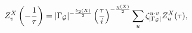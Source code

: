 \begin{equation}
Z^X_v\left(-\frac{1}{\tau}\right)=\vert\Gamma_{\cal G}\vert^{-\frac{b_2(X)}{2}}
\left(
\frac{\tau}{i}
\right)^{-\frac{\chi(X)}{2}}
\sum_u\zeta_{|\Gamma_{\cal G}|}^{u\cdot v}Z_u^X(\tau),
\label{m-o}
\end{equation}

